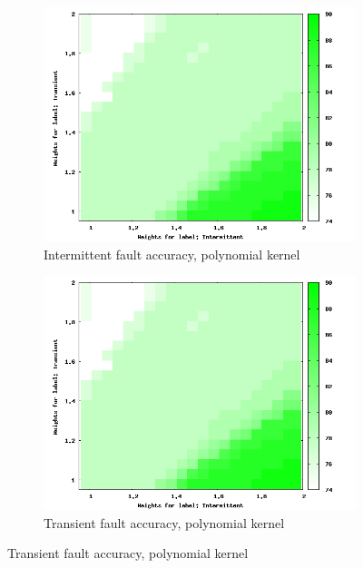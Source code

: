 \begin{figure}
			\begin{subfigure}[h]{0.45\linewidth}
                \includegraphics[scale=0.25]{figures/poly256i.png}
                \caption{Intermittent fault accuracy, polynomial kernel}
        \end{subfigure}
        \begin{subfigure}[h]{0.45\linewidth}
                \includegraphics[scale=0.25]{figures/poly256i.png}
                \caption{Transient fault accuracy, polynomial kernel}
        \end{subfigure}


\end{figure}
